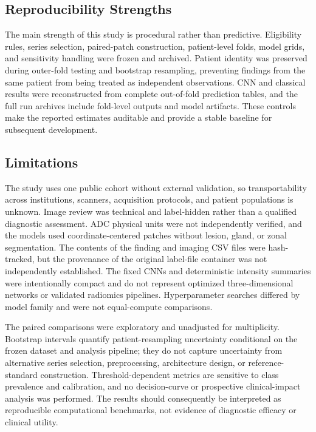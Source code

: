 \documentclass[11pt]{article}
\begin{document}
\subsection{Reproducibility Strengths}\label{sec:5.4}

The main strength of this study is procedural rather than predictive. Eligibility rules, series selection, paired-patch construction, patient-level folds, model grids, and sensitivity handling were frozen and archived. Patient identity was preserved during outer-fold testing and bootstrap resampling, preventing findings from the same patient from being treated as independent observations. CNN and classical results were reconstructed from complete out-of-fold prediction tables, and the full run archives include fold-level outputs and model artifacts. These controls make the reported estimates auditable and provide a stable baseline for subsequent development.

\subsection{Limitations}\label{sec:5.5}

The study uses one public cohort without external validation, so transportability across institutions, scanners, acquisition protocols, and patient populations is unknown. Image review was technical and label-hidden rather than a qualified diagnostic assessment. ADC physical units were not independently verified, and the models used coordinate-centered patches without lesion, gland, or zonal segmentation. The contents of the finding and imaging CSV files were hash-tracked, but the provenance of the original label-file container was not independently established. The fixed CNNs and deterministic intensity summaries were intentionally compact and do not represent optimized three-dimensional networks or validated radiomics pipelines. Hyperparameter searches differed by model family and were not equal-compute comparisons.

The paired comparisons were exploratory and unadjusted for multiplicity. Bootstrap intervals quantify patient-resampling uncertainty conditional on the frozen dataset and analysis pipeline; they do not capture uncertainty from alternative series selection, preprocessing, architecture design, or reference-standard construction. Threshold-dependent metrics are sensitive to class prevalence and calibration, and no decision-curve or prospective clinical-impact analysis was performed. The results should consequently be interpreted as reproducible computational benchmarks, not evidence of diagnostic efficacy or clinical utility.
\end{document}
